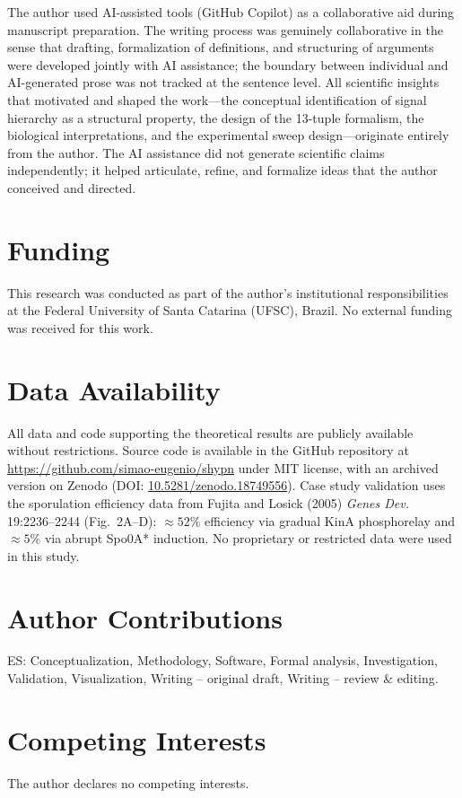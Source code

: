 \documentclass[10pt,letterpaper]{article}
\begin{document}
The author used AI-assisted tools (GitHub Copilot) as a collaborative aid during
manuscript preparation. The writing process was genuinely collaborative in the
sense that drafting, formalization of definitions, and structuring of arguments
were developed jointly with AI assistance; the boundary between individual and
AI-generated prose was not tracked at the sentence level. All scientific insights
that motivated and shaped the work---the conceptual identification of signal
hierarchy as a structural property, the design of the 13-tuple formalism, the
biological interpretations, and the experimental sweep design---originate
entirely from the author. The AI assistance did not generate scientific claims
independently; it helped articulate, refine, and formalize ideas that the author
conceived and directed.

\section*{Funding}

This research was conducted as part of the author's institutional responsibilities at the Federal University of Santa Catarina (UFSC), Brazil. No external funding was received for this work.

\section*{Data Availability}

All data and code supporting the theoretical results are publicly available without restrictions. Source code is available in the GitHub repository at \url{https://github.com/simao-eugenio/shypn} under MIT license, with an archived version on Zenodo (DOI: \href{https://doi.org/10.5281/zenodo.18749556}{10.5281/zenodo.18749556}). Case study validation uses the sporulation efficiency data from Fujita and Losick (2005) \textit{Genes Dev.} 19:2236--2244 (Fig.~2A--D): $\approx 52\%$ efficiency via gradual KinA phosphorelay and $\approx 5\%$ via abrupt Spo0A* induction. No proprietary or restricted data were used in this study.

\section*{Author Contributions}

ES: Conceptualization, Methodology, Software, Formal analysis, Investigation, Validation, Visualization, Writing -- original draft, Writing -- review \& editing.

\section*{Competing Interests}

The author declares no competing interests.



\end{document}
